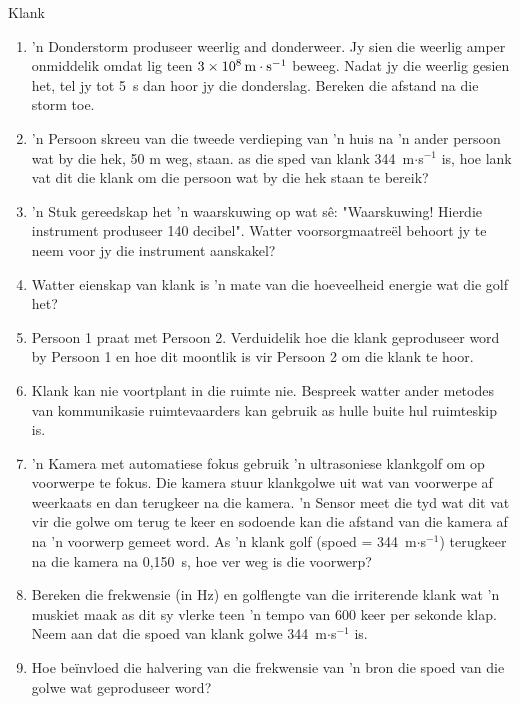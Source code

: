 \begin{eocexercises}{Klank}
\begin{enumerate}[noitemsep, label=\textbf{\arabic*}. ]
\item 'n Donderstorm produseer weerlig and donderweer. Jy sien die weerlig amper onmiddelik omdat lig teen $3\ensuremath{\times}{10}^{8}\phantom{\rule{0.166667em}{0ex}}\text{m}\ensuremath{\cdot}{\text{s}}^{-1}$ beweeg. Nadat jy die weerlig gesien het, tel jy tot 5~s dan hoor jy die donderslag. Bereken die afstand na die storm toe.

\item 'n Persoon skreeu van die tweede verdieping van 'n huis na 'n ander persoon wat by die hek, 50 m weg, staan. as die sped van klank 344~m$\ensuremath{\cdot}$s${}^{-1}$ is, hoe lank vat dit die klank om die persoon wat by die hek staan te bereik?

\item  'n Stuk gereedskap het 'n waarskuwing op wat s\^e: "Waarskuwing! Hierdie instrument produseer 140 decibel". Watter voorsorgmaatre\"el behoort jy te neem voor jy die instrument aanskakel?

\item Watter eienskap van klank is 'n mate van die hoeveelheid energie wat die golf het?

\item Persoon 1 praat met Persoon 2. Verduidelik hoe die klank geproduseer word by Persoon 1 en hoe dit moontlik is vir Persoon 2 om die klank te hoor.

\item Klank kan nie voortplant in die ruimte nie. Bespreek watter ander metodes van kommunikasie ruimtevaarders kan gebruik as hulle buite hul ruimteskip is.

\item 'n Kamera met automatiese fokus gebruik 'n ultrasoniese klankgolf om op voorwerpe te fokus. Die kamera stuur klankgolwe uit wat van voorwerpe af weerkaats en dan terugkeer na die kamera. 'n Sensor meet die tyd wat dit vat vir die golwe om terug te keer en sodoende kan die afstand van die kamera af na 'n voorwerp gemeet word. As 'n klank golf (spoed = 344~m$\ensuremath{\cdot}$s${}^{-1}$) terugkeer na die kamera na 0,150~s, hoe ver weg is die voorwerp?

\item Bereken die frekwensie (in Hz) en golflengte van die irriterende klank wat 'n muskiet maak as dit sy vlerke teen 'n tempo van 600 keer per sekonde klap. Neem aan dat die spoed van klank golwe 344~m$\ensuremath{\cdot}$s${}^{-1}$ is.

\item Hoe be\"invloed die halvering van die frekwensie van 'n bron die spoed van die golwe wat geproduseer word?


\end{enumerate}
\end{eocexercises}
